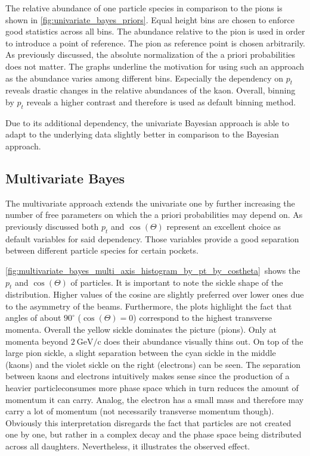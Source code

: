 The relative abundance of one particle species in comparison to the pions is shown in \autoref{fig:univariate_bayes_priors}. Equal height bins are chosen to enforce good statistics across all bins. The abundance relative to the pion is used in order to introduce a point of reference. The pion as reference point is chosen arbitrarily. As previously discussed, the absolute normalization of the a priori probabilities does not matter. The graphs underline the motivation for using such an approach as the abundance varies among different bins. Especially the dependency on $p_t$ reveals drastic changes in the relative abundances of the kaon. Overall, binning by $p_t$ reveals a higher contrast and therefore is used as default binning method.

Due to its additional dependency, the univariate Bayesian approach is able to adapt to the underlying data slightly better in comparison to the Bayesian approach.

\subsection{Multivariate Bayes}
\label{sec:bayesian_approach_multivariate_bayes}

The multivariate approach extends the univariate one by further increasing the number of free parameters on which the a priori probabilities may depend on. As previously discussed both $p_t$ and $\cos(\Theta)$ represent an excellent choice as default variables for said dependency. Those variables provide a good separation between different particle species for certain pockets.

\autoref{fig:multivariate_bayes_multi_axis_histogram_by_pt_by_costheta}~shows the $p_t$ and $\cos(\Theta)$ of particles. It is important to note the sickle shape of the distribution. Higher values of the cosine are slightly preferred over lower ones due to the asymmetry of the beams. Furthermore, the plots highlight the fact that angles of about $90^{\circ}$ ($\cos(\Theta) = 0$) correspond to the highest transverse momenta. Overall the yellow sickle dominates the picture (pions). Only at momenta beyond $2 \mathrm{~GeV/c}$ does their abundance visually thins out. On top of the large pion sickle, a slight separation between the cyan sickle in the middle (kaons) and the violet sickle on the right (electrons) can be seen. The separation between kaons and electrons intuitively makes sense since the production of a heavier particle\footnotemark consumes more phase space which in turn reduces the amount of momentum it can carry. Analog, the electron has a small mass and therefore may carry a lot of momentum (not necessarily transverse momentum though). Obviously this interpretation disregards the fact that particles are not created one by one, but rather in a complex decay and the phase space being distributed across all daughters. Nevertheless, it illustrates the observed effect.

